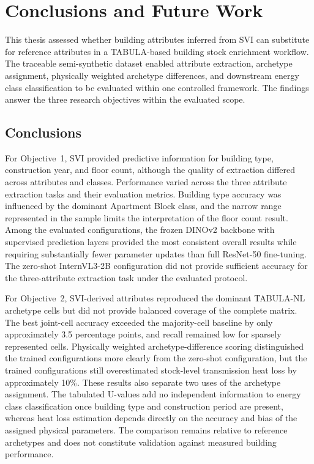 \chapter{Conclusions and Future Work}
\label{ch:conclusions}

This thesis assessed whether building attributes inferred from \ac{SVI} can substitute for reference attributes in a TABULA-based building stock enrichment workflow.
The traceable semi-synthetic dataset enabled attribute extraction, archetype assignment, physically weighted archetype differences, and downstream energy class classification to be evaluated within one controlled framework.
The findings answer the three research objectives within the evaluated scope.

\section{Conclusions}
\label{sec:conclusions}

For Objective~1, \ac{SVI} provided predictive information for building type, construction year, and floor count, although the quality of extraction differed across attributes and classes.
Performance varied across the three attribute extraction tasks and their evaluation metrics.
Building type accuracy was influenced by the dominant Apartment Block class, and the narrow range represented in the sample limits the interpretation of the floor count result.
Among the evaluated configurations, the frozen DINOv2 backbone with supervised prediction layers provided the most consistent overall results while requiring substantially fewer parameter updates than full ResNet-50 fine-tuning.
The zero-shot InternVL3-2B configuration did not provide sufficient accuracy for the three-attribute extraction task under the evaluated protocol.

For Objective~2, \ac{SVI}-derived attributes reproduced the dominant TABULA-NL archetype cells but did not provide balanced coverage of the complete matrix.
The best joint-cell accuracy exceeded the majority-cell baseline by only approximately 3.5 percentage points, and recall remained low for sparsely represented cells.
Physically weighted archetype-difference scoring distinguished the trained configurations more clearly from the zero-shot configuration, but the trained configurations still overestimated stock-level transmission heat loss by approximately 10\%.
These results also separate two uses of the archetype assignment.
The tabulated U-values add no independent information to energy class classification once building type and construction period are present, whereas heat loss estimation depends directly on the accuracy and bias of the assigned physical parameters.
The comparison remains relative to reference archetypes and does not constitute validation against measured building performance.

